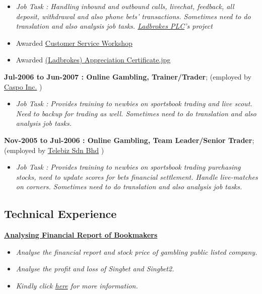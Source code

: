 \documentclass[]{article}
\providecommand{\tightlist}{%
  \setlength{\itemsep}{0pt}\setlength{\parskip}{0pt}}
\begin{document}
\begin{itemize}
\tightlist
\item
  \emph{Job Task : Handling inbound and outbound calls, livechat,
  feedback, all deposit, withdrawal and also phone bets' transactions.
  Sometimes need to do translation and also analysis job tasks.
  \href{http://www.ladbrokesplc.com/}{Ladbrokes PLC}'s project}
\item
  Awarded
  \href{https://raw.githubusercontent.com/scibrokes/owner/master/documents/Scicom\%20CS\%20Workshop.jpg}{Customer
  Service Workshop}
\item
  Awarded
  \href{https://raw.githubusercontent.com/scibrokes/owner/master/documents/Scicom\%20Appreciation\%20Certificate.jpg}{(Ladbrokes)
  Appreciation Certificate.jpg}
\end{itemize}

\textbf{Jul-2006 to Jun-2007 : Online Gambling, Trainer/Trader};
(employed by
\href{http://www.callcenterbeat.com/caspo-philippines/}{Caspo Inc.} )

\begin{itemize}
\tightlist
\item
  \emph{Job Task : Provides training to newbies on sportsbook trading
  and live scout. Need to backup for trading as well. Sometimes need to
  do translation and also analysis job tasks.}
\end{itemize}

\textbf{Nov-2005 to Jul-2006 : Online Gambling, Team Leader/Senior
Trader}; (employed by \href{http://www.telebizness.com/}{Telebiz Sdn
Bhd} )

\begin{itemize}
\tightlist
\item
  \emph{Job Task : Provides training to newbies on sportsbook trading
  purchasing stocks, need to update scores for bets financial
  settlement. Handle live-matches on corners. Sometimes need to do
  translation and also analysis job tasks.}
\end{itemize}

\subsection{Technical Experience}\label{technical-experience}

\href{https://github.com/scibrokes/analyse-the-finance-and-stocks-price-of-bookmakers}{\textbf{Analysing
Financial Report of Bookmakers}}

\begin{itemize}
\tightlist
\item
  \emph{Analyse the financial report and stock price of gambling public
  listed company.}
\item
  \emph{Analyse the profit and loss of Singbet and Singbet2.}
\item
  \emph{Kindly click
  \href{https://github.com/scibrokes/analyse-the-finance-and-stocks-price-of-bookmakers}{here}
  for more information.}
\end{itemize}
\end{document}
